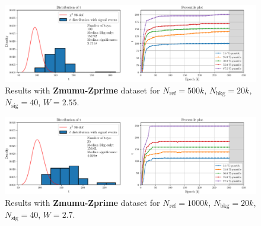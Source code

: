 \vspace{-5mm}
\begin{figure}[H]
	\centering
	\includegraphics[width=1.0\textwidth]{Python/RESULTS/ref500000_bkg20000_sig40/data_ref500000_bkg20000_sig40_wclip2-55.pdf}
	\caption{Results with \textbf{Zmumu-Zprime} dataset for $N_\mathrm{ref}=500\si{k}$, $N_\mathrm{bkg}=20\si{k}$, $N_\mathrm{sig}=40$, $W=2.55$.}
	\label{fig:REF500000_BKG20000_SIG40_WCLIP2.55}
\end{figure}
\vspace{-5mm}
\begin{figure}[H]
	\centering
	\includegraphics[width=1.0\textwidth]{Python/RESULTS/ref1000000_bkg20000_sig40/data_ref1000000_bkg20000_sig40_wclip2-7.pdf}
	\caption{Results with \textbf{Zmumu-Zprime} dataset for $N_\mathrm{ref}=1000\si{k}$, $N_\mathrm{bkg}=20\si{k}$, $N_\mathrm{sig}=40$, $W=2.7$.}
	\label{fig:REF1000000_BKG20000_SIG40_WCLIP2.7}
\end{figure}





